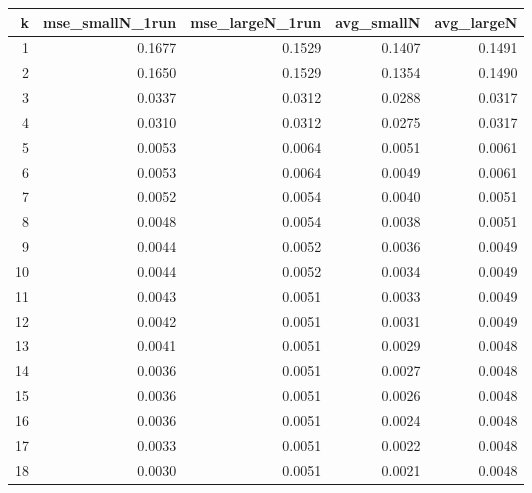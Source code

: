 \begin{tabular}{rrrrr}
\toprule
k & mse_smallN_1run & mse_largeN_1run & avg_smallN & avg_largeN \\
\midrule
1 & 0.1677 & 0.1529 & 0.1407 & 0.1491 \\
2 & 0.1650 & 0.1529 & 0.1354 & 0.1490 \\
3 & 0.0337 & 0.0312 & 0.0288 & 0.0317 \\
4 & 0.0310 & 0.0312 & 0.0275 & 0.0317 \\
5 & 0.0053 & 0.0064 & 0.0051 & 0.0061 \\
6 & 0.0053 & 0.0064 & 0.0049 & 0.0061 \\
7 & 0.0052 & 0.0054 & 0.0040 & 0.0051 \\
8 & 0.0048 & 0.0054 & 0.0038 & 0.0051 \\
9 & 0.0044 & 0.0052 & 0.0036 & 0.0049 \\
10 & 0.0044 & 0.0052 & 0.0034 & 0.0049 \\
11 & 0.0043 & 0.0051 & 0.0033 & 0.0049 \\
12 & 0.0042 & 0.0051 & 0.0031 & 0.0049 \\
13 & 0.0041 & 0.0051 & 0.0029 & 0.0048 \\
14 & 0.0036 & 0.0051 & 0.0027 & 0.0048 \\
15 & 0.0036 & 0.0051 & 0.0026 & 0.0048 \\
16 & 0.0036 & 0.0051 & 0.0024 & 0.0048 \\
17 & 0.0033 & 0.0051 & 0.0022 & 0.0048 \\
18 & 0.0030 & 0.0051 & 0.0021 & 0.0048 \\
\bottomrule
\end{tabular}
